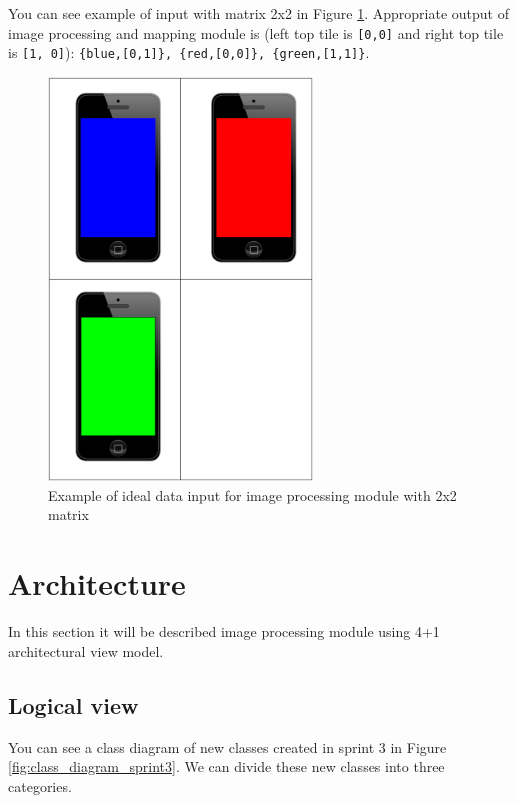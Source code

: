 You can see example of input with matrix 2x2 in Figure \ref{img:sprint3_goal}. 
Appropriate output of image processing and mapping module is (left top tile is \texttt{[0,0]} and right top tile is \texttt{[1, 0]}): \texttt{\{blue,[0,1]\}, \{red,[0,0]\}, \{green,[1,1]\}}.

\begin{figure}[h]
	\centering
		\includegraphics[width=7cm,angle=90]{sprint3/sprint3_goal.pdf}
	\caption[Goal for sprint 3]{Example of ideal data input for image processing module with 2x2 matrix}
	\label{img:sprint3_goal}
\end{figure}

\section{Architecture} \label{txt:sprint3_architecture}
In this section it will be described image processing module using 4+1 architectural view model.

\subsection{Logical view}
You can see a class diagram of new classes created in sprint 3 in Figure \ref{fig:class_diagram_sprint3}. We can divide these new classes into three categories. 

